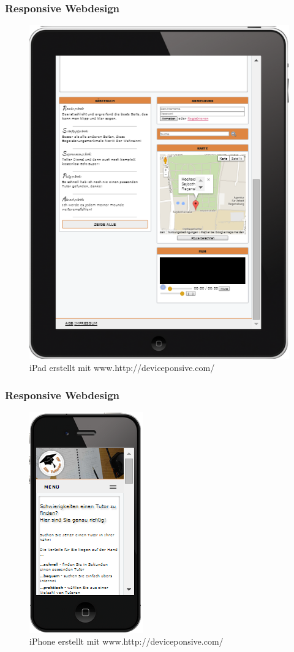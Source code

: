 \begin{frame}
  \frametitle{Responsive Webdesign}
\begin{figure}[!htbp]
 \centering
 \includegraphics[scale=.3]{./Source/Ipad2.png}
 \caption{iPad erstellt mit www.http://deviceponsive.com/}

\end{figure}
\end{frame}

\begin{frame}
  \frametitle{Responsive Webdesign}
\begin{figure}[!htbp]
 \centering
 \includegraphics[scale=0.5]{./Source/Iphone1.png}
 \caption{iPhone erstellt mit www.http://deviceponsive.com/}

\end{figure}
\end{frame}

